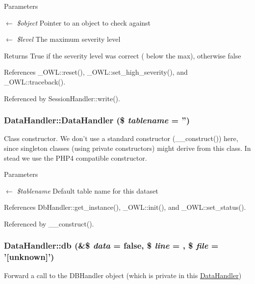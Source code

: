 \begin{DoxyParams}{Parameters}
\item[\mbox{$\leftarrow$} {\em \$object}]Pointer to an object to check against \item[\mbox{$\leftarrow$} {\em \$level}]The maximum severity level \end{DoxyParams}
\begin{DoxyReturn}{Returns}
True if the severity level was correct ( below the max), otherwise false 
\end{DoxyReturn}


References \_\-OWL::reset(), \_\-OWL::set\_\-high\_\-severity(), and \_\-OWL::traceback().



Referenced by SessionHandler::write().

\subsubsection[{DataHandler}]{\setlength{\rightskip}{0pt plus 5cm}DataHandler::DataHandler (\$ {\em tablename} = {\ttfamily ''})}\label{classDataHandler_aed5b2eb4ca7b2e4b0c1563d817d73c16}
Class constructor. We don't use a standard constructor (\_\-\_\-construct()) here, since singleton classes (using private constructors) might derive from this class. In stead we use the PHP4 compatible constructor. 
\begin{DoxyParams}{Parameters}
\item[\mbox{$\leftarrow$} {\em \$tablename}]Default table name for this dataset \end{DoxyParams}


References DbHandler::get\_\-instance(), \_\-OWL::init(), and \_\-OWL::set\_\-status().



Referenced by \_\-\_\-construct().

\subsubsection[{db}]{\setlength{\rightskip}{0pt plus 5cm}DataHandler::db (\&\$ {\em data} = {\ttfamily false}, \/  \$ {\em line} = {}, \/  \$ {\em file} = {\ttfamily '\mbox{[}unknown\mbox{]}'})}\label{classDataHandler_abb329fe5a97eb8df928aabfc8078ff23}
Forward a call to the DBHandler object (which is private in this \hyperlink{classDataHandler}{DataHandler})


